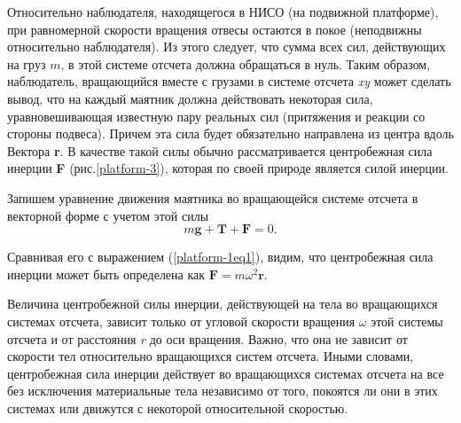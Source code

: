 \documentclass[14pt,a4paper,oneside]{extarticle}	%
\begin{document}
Относительно наблюдателя, находящегося в НИСО (на подвижной платформе), при равномерной скорости вращения отвесы остаются в покое (неподвижны относительно наблюдателя).
Из этого следует, что сумма всех сил, действующих на груз $ m $, в этой системе отсчета должна обращаться в нуль.
Таким образом, наблюдатель, вращающийся вместе с грузами в системе отсчета \textit{xy} может сделать вывод, что на каждый маятник должна действовать некоторая сила, уравновешивающая известную пару реальных сил (притяжения и реакции со стороны подвеса).
Причем эта сила будет обязательно направлена из центра вдоль Вектора \textbf{r}. 
В качестве такой силы обычно рассматривается центробежная сила инерции \textbf{F} (рис.\ref{platform-3}), которая по своей природе является силой инерции.

Запишем уравнение движения маятника во вращающейся системе отсчета в векторной форме с учетом этой силы
\begin{equation}\label{platform-1eq3}
m\textbf{g}+\textbf{T}+\textbf{F}=0.
\end{equation}

Сравнивая его с выражением (\ref{platform-1eq1}), видим, что центробежная сила инерции может быть определена как $ \textbf{F}=m\omega^{2}\textbf{r} $.

Величина центробежной силы инерции, действующей на тела во вращающихся системах отсчета, зависит только от угловой скорости вращения $ \omega $ этой системы отсчета и от расстояния \textit{r} до оси вращения.
Важно, что она не зависит от скорости тел относительно вращающихся систем отсчета.
Иными словами, центробежная сила инерции действует во вращающихся системах отсчета на все без исключения материальные тела независимо от того, покоятся ли они в этих системах или движутся с некоторой относительной скоростью.
				
\end{document}
